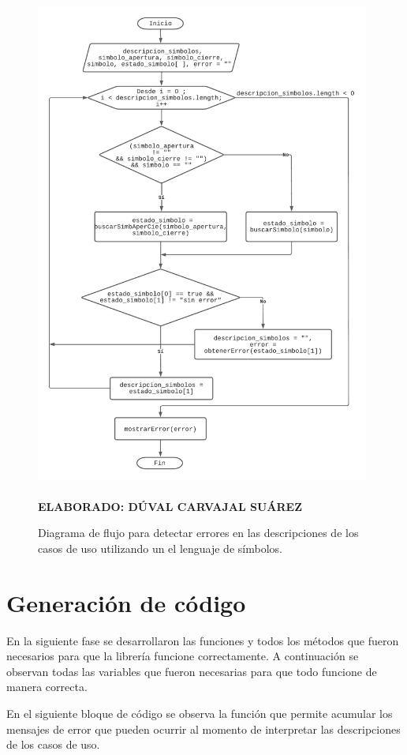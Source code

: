 \begin{figure}[h!]
	\caption{Diagrama de flujo para detectar errores en las descripciones de los casos de uso utilizando un el lenguaje de símbolos.}
	\includegraphics[width=11cm]{img/algoritmoerror.png}
	\label{fig:algoritmoerror}
	\textbf{\\ \\ ELABORADO: DÚVAL CARVAJAL SUÁREZ}
\end{figure} 

\section{Generación de código}

En la siguiente fase se desarrollaron las funciones y todos los métodos que fueron necesarios para que la librería funcione correctamente. A continuación se observan todas las variables que fueron necesarias para que todo funcione de manera correcta.
\newpage


En el siguiente bloque de código se observa la función que permite acumular los mensajes de error que pueden ocurrir al momento de interpretar las descripciones de los casos de uso. 

